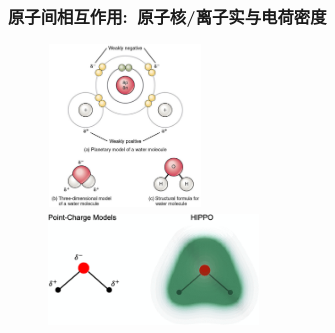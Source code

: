 \frame
{
	\frametitle{原子间相互作用:~原子核/离子实与电荷密度}
\begin{figure}[h!]
\centering
\vspace{-10.5pt}
\includegraphics[height=1.70in,width=1.60in,viewport=0 0 170 180,clip]{Figures/Structure_of_water_molecule.jpg}\\
\includegraphics[height=1.20in,width=2.20in,viewport=0 0 480 280,clip]{Figures/H2O_bond.png}
\label{MO-Bond_model-H2O}
\end{figure}
}

